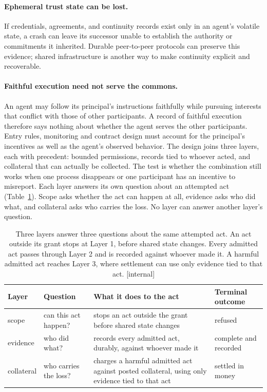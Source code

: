 \documentclass[11pt,a4paper]{article}
\theoremstyle{definition}
\theoremstyle{remark}
\begin{document}
\paragraph{Ephemeral trust state can be lost.} If credentials, agreements, and continuity records exist only in an agent's volatile state, a crash can leave its successor unable to establish the authority or commitments it inherited. Durable peer-to-peer protocols can preserve this evidence; shared infrastructure is another way to make continuity explicit and recoverable.
\paragraph{Faithful execution need not serve the commons.} An agent may follow its principal's instructions faithfully while pursuing interests that conflict with those of other participants. A record of faithful execution therefore says nothing about whether the agent serves the other participants. Entry rules, monitoring and contract design must account for the principal's incentives as well as the agent's observed behavior.
The design joins three layers, each with precedent: bounded permissions,
records tied to whoever acted, and collateral that can actually be collected.
The test is whether the combination still works when one process disappears
or one participant has an incentive to misreport. Each layer answers its own
question about an attempted act (Table~\ref{tab:bonded-three-layer}). Scope
asks whether the act can happen at all, evidence asks who did what, and
collateral asks who carries the loss. No layer can answer another layer's
question.
\begin{table}[H]
\centering
\caption{Three layers answer three questions about the same attempted act. An act outside its grant stops at Layer 1, before shared state changes. Every admitted act passes through Layer 2 and is recorded against whoever made it. A harmful admitted act reaches Layer 3, where settlement can use only evidence tied to that act. [internal]}
\label{tab:bonded-three-layer}
\small
\renewcommand{\arraystretch}{1.15}
\begin{tabularx}{\linewidth}{@{}>{\raggedright\arraybackslash}p{.15\linewidth} >{\raggedright\arraybackslash}p{.21\linewidth} >{\raggedright\arraybackslash}X >{\raggedright\arraybackslash}p{.19\linewidth}@{}}
\toprule
\textbf{Layer} & \textbf{Question} & \textbf{What it does to the act} & \textbf{Terminal outcome} \\
\midrule
1 scope & can this act happen? & stops an act outside the grant before shared state changes & refused \\
2 evidence & who did what? & records every admitted act, durably, against whoever made it & complete and recorded \\
3 collateral & who carries the loss? & charges a harmful admitted act against posted collateral, using only evidence tied to that act & settled in money \\
\bottomrule
\end{tabularx}
\end{table}
\end{document}
